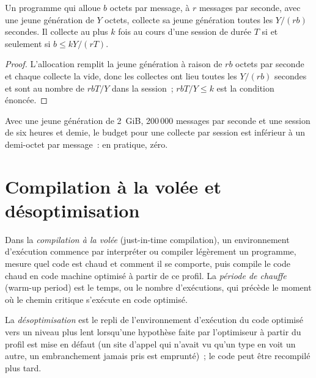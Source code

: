\begin{proposition}\label{prop:ll:managed-and-functional-languages-on-the-desk:budget}
Un programme qui alloue $b$ octets par message, à $r$ messages par seconde, avec une jeune génération de $Y$ octets, collecte sa
jeune génération toutes les $Y/(rb)$ secondes. Il collecte au plus $k$ fois au cours d'une session de durée $T$ si et seulement si
$b \le kY/(rT)$.
\end{proposition}

\begin{proof}
L'allocation remplit la jeune génération à raison de $rb$ octets par seconde et chaque collecte la vide, donc les collectes ont lieu toutes les
$Y/(rb)$ secondes et sont au nombre de $rbT/Y$ dans la session~; $rbT/Y \le k$ est la condition énoncée.
\end{proof}

Avec une jeune génération de 2~GiB, 200\,000 messages par seconde et une session de six heures et demie, le budget pour une
collecte par session est inférieur à un demi-octet par message~: en pratique, zéro.

\section{Compilation à la volée et désoptimisation}

\begin{definition}\label{def:ll:managed-and-functional-languages-on-the-desk:jit}
Dans la \emph{compilation à la volée} (just-in-time compilation), un environnement d'exécution commence par interpréter ou compiler légèrement un programme,
mesure quel code est chaud et comment il se comporte, puis compile le code chaud en code machine optimisé à partir de ce profil.
La \emph{période de chauffe} (warm-up period) est le temps, ou le nombre d'exécutions,
qui précède le moment où le chemin critique s'exécute en code optimisé.
\end{definition}

\begin{definition}[Désoptimisation]\label{def:ll:managed-and-functional-languages-on-the-desk:deopt}
La \emph{désoptimisation} est le repli de l'environnement d'exécution du code optimisé vers un niveau plus lent lorsqu'une
hypothèse faite par l'optimiseur à partir du profil est mise en défaut (un site d'appel qui n'avait vu qu'un type en voit un autre, un embranchement
jamais pris est emprunté)~; le code peut être recompilé plus tard.
\end{definition}

